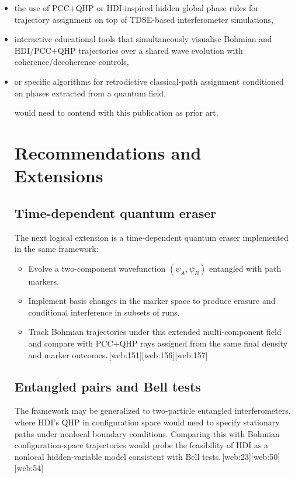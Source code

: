\documentclass[11pt]{article}
\begin{document}
\begin{itemize}[leftmargin=*]
  \item the use of PCC+QHP or HDI-inspired hidden global phase rules for trajectory assignment on top of TDSE-based interferometer simulations,
  \item interactive educational tools that simultaneously visualise Bohmian and HDI/PCC+QHP trajectories over a shared wave evolution with coherence/decoherence controls,
  \item or specific algorithms for retrodictive classical-path assignment conditioned on phases extracted from a quantum field,

would need to contend with this publication as prior art.

\section{Recommendations and Extensions}

\subsection{Time-dependent quantum eraser}

The next logical extension is a time-dependent quantum eraser implemented in the same framework:

\begin{itemize}[leftmargin=*]
  \item Evolve a two-component wavefunction \((\psi_A,\psi_B)\) entangled with path markers.
  \item Implement basis changes in the marker space to produce erasure and conditional interference in subsets of runs.
  \item Track Bohmian trajectories under this extended multi-component field and compare with PCC+QHP rays assigned from the same final density and marker outcomes.\,[web:151][web:156][web:157]
\end{itemize}

\subsection{Entangled pairs and Bell tests}

The framework may be generalized to two-particle entangled interferometers, where HDI's QHP in configuration space would need to specify stationary paths under nonlocal boundary conditions.
Comparing this with Bohmian configuration-space trajectories would probe the feasibility of HDI as a nonlocal hidden-variable model consistent with Bell tests.\,[web:23][web:50][web:54]


\end{itemize}
\end{document}
